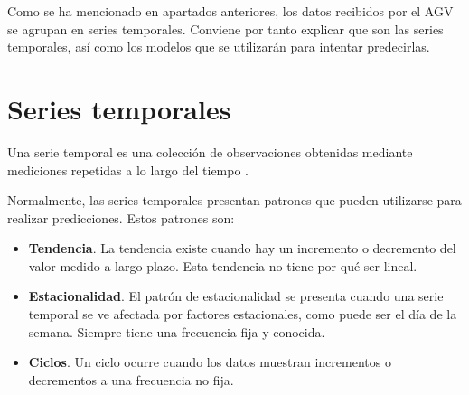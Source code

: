 
Como se ha mencionado en apartados anteriores, los datos recibidos por el AGV se agrupan en series temporales. Conviene por tanto explicar
que son las series temporales, así como los modelos que se utilizarán para intentar predecirlas.


\section{Series temporales}

Una serie temporal es una colección de observaciones obtenidas mediante mediciones repetidas a lo largo del tiempo \cite{influx:timeseries}.

Normalmente, las series temporales presentan patrones que pueden utilizarse para realizar predicciones. Estos patrones son:
\begin{itemize}
    \item \textbf{Tendencia}. La tendencia existe cuando hay un incremento o decremento del valor medido a largo plazo. Esta tendencia
        no tiene por qué ser lineal.
    \item \textbf{Estacionalidad}. El patrón de estacionalidad se presenta cuando una serie temporal se ve afectada por factores estacionales,
        como puede ser el día de la semana. Siempre tiene una frecuencia fija y conocida.
    \item \textbf{Ciclos}. Un ciclo ocurre cuando los datos muestran incrementos o decrementos a una frecuencia no fija.
\end{itemize}


